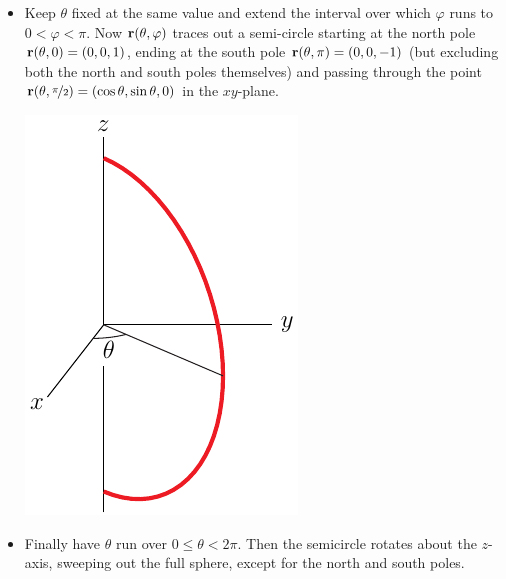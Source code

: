 \begin{eg}[Sphere]
\begin{itemize}
\item Keep $\theta$ fixed at the same value and extend the interval over which  
$\varphi$ runs to $0<\varphi<\pi$. Now $\mathbf{r}(\theta,\varphi)$ traces out a 
semi-circle starting at the north pole $\mathbf{r}(\theta,0) = (0,0,1)$,
ending at the south pole $\mathbf{r}(\theta,\pi) = (0,0,-1)$
(but excluding both the north and south poles themselves) and passing 
through the point
$\mathbf{r}(\theta,\nicefrac{\pi}{2}) = (\cos\theta,\sin\theta,0)$ in the $xy$-plane.

\begin{nfig}
\begin{center} 
   \includegraphics{sphericalRngB.pdf}
\end{center}
\end{nfig}

\item
Finally have $\theta$  run over $0\le\theta<2\pi$. Then the semicircle 
rotates about the $z$-axis, sweeping out the full sphere, except for
the north and south poles.


\end{itemize}


\end{eg}
